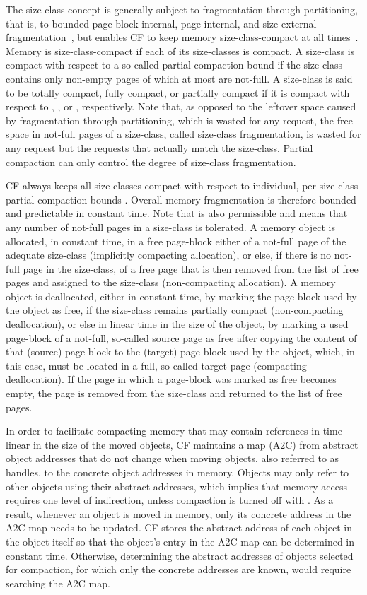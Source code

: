 \documentclass{amsart}
\begin{document}
The size-class concept is generally subject to fragmentation through
partitioning, that is, to bounded page-block-internal, page-internal,
and size-external fragmentation~\cite{Bac1}, but enables CF to keep
memory size-class-compact at all times~\cite{USENIX08}.  Memory is
size-class-compact if each of its size-classes is compact.  A
size-class is compact with respect to a so-called partial compaction
bound  if the size-class contains only non-empty pages of
which at most  are not-full.  A size-class is said to be
totally compact, fully compact, or partially compact if it is compact
with respect to , , or , respectively.
Note that, as opposed to the leftover space caused by fragmentation
through partitioning, which is wasted for any request, the free space
in not-full pages of a size-class, called size-class fragmentation, is
wasted for any request but the requests that actually match the
size-class.  Partial compaction can only control the degree of
size-class fragmentation.

CF always keeps all size-classes compact with respect to individual,
per-size-class partial compaction bounds .  Overall memory
fragmentation is therefore bounded and predictable in constant time.
Note that  is also permissible and means that any
number of not-full pages in a size-class is tolerated.  A memory
object is allocated, in constant time, in a free page-block either of
a not-full page of the adequate size-class (implicitly compacting
allocation), or else, if there is no not-full page in the size-class,
of a free page that is then removed from the list of free pages and
assigned to the size-class (non-compacting allocation).  A memory
object is deallocated, either in constant time, by marking the
page-block used by the object as free, if the size-class remains
partially compact (non-compacting deallocation), or else in linear
time in the size of the object, by marking a used page-block of a
not-full, so-called source page as free after copying the content of
that (source) page-block to the (target) page-block used by the
object, which, in this case, must be located in a full, so-called
target page (compacting deallocation).  If the page in which a
page-block was marked as free becomes empty, the page is removed from
the size-class and returned to the list of free pages.

In order to facilitate compacting memory that may contain references
in time linear in the size of the moved objects, CF maintains a map
(A2C) from abstract object addresses that do not change when moving
objects, also referred to as handles, to the concrete object addresses
in memory.  Objects may only refer to other objects using their
abstract addresses, which implies that memory access requires one
level of indirection, unless compaction is turned off with
.  As a result, whenever an object is moved in memory,
only its concrete address in the A2C map needs to be updated.  CF
stores the abstract address of each object in the object itself so
that the object's entry in the A2C map can be determined in constant
time.  Otherwise, determining the abstract addresses of objects
selected for compaction, for which only the concrete addresses are
known, would require searching the A2C map.
\end{document}
